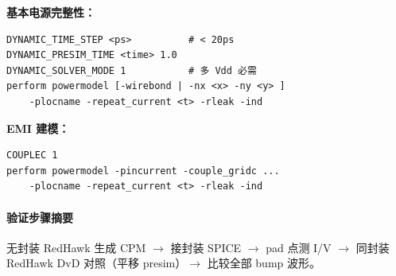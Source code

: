 \textbf{基本电源完整性：}
\begin{lstlisting}
DYNAMIC_TIME_STEP <ps>          # < 20ps
DYNAMIC_PRESIM_TIME <time> 1.0
DYNAMIC_SOLVER_MODE 1           # 多 Vdd 必需
perform powermodel [-wirebond | -nx <x> -ny <y> ]
    -plocname -repeat_current <t> -rleak -ind
\end{lstlisting}

\textbf{EMI 建模：}
\begin{lstlisting}
COUPLEC 1
perform powermodel -pincurrent -couple_gridc ...
    -plocname -repeat_current <t> -rleak -ind
\end{lstlisting}

\paragraph{验证步骤摘要}
无封装 RedHawk 生成 CPM $\rightarrow$ 接封装 SPICE $\rightarrow$ pad 点测 I/V $\rightarrow$ 同封装 RedHawk DvD 对照（平移 presim）$\rightarrow$ 比较全部 bump 波形。

